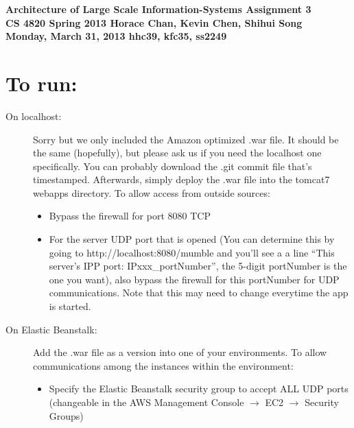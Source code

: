 \documentclass{article}
\begin{document}
\begin{framed}
  \large{\textbf{Architecture of Large Scale Information-Systems  \hfill Assignment 3\\
      CS 4820 Spring 2013 \hfill Horace Chan, Kevin Chen, Shihui Song \\
      Monday, March 31, 2013 \hfill hhc39, kfc35, ss2249
  }}
\end{framed}

\section{To run:}
  \begin{description}
    \item[On localhost:] Sorry but we only included the Amazon optimized .war file. It should be the same (hopefully), but please ask us if you need the localhost one specifically. You can probably download the .git commit file that's timestamped. Afterwards, simply deploy the .war file into the tomcat7 webapps directory. To allow access from outside sources:
      \begin{itemize}
        \item Bypass the firewall for port 8080 TCP
        \item For the server UDP port that is opened (You can determine this by going to http://localhost:8080/mumble and you'll see a a line ``This server's IPP port: IPxxx\_portNumber'', the 5-digit portNumber is the one you want), also bypass the firewall for this portNumber for UDP communications. Note that this may need to change everytime the app is started.
      \end{itemize}
    \item[On Elastic Beanstalk:] Add the .war file as a version into one of your environments. To allow communications among the instances within the environment:
      \begin{itemize}
        \item Specify the Elastic Beanstalk security group to accept ALL UDP ports (changeable in the AWS Management Console $\to$ EC2 $\to$ Security Groups)
      \end{itemize}
  \end{description}
\end{document}
